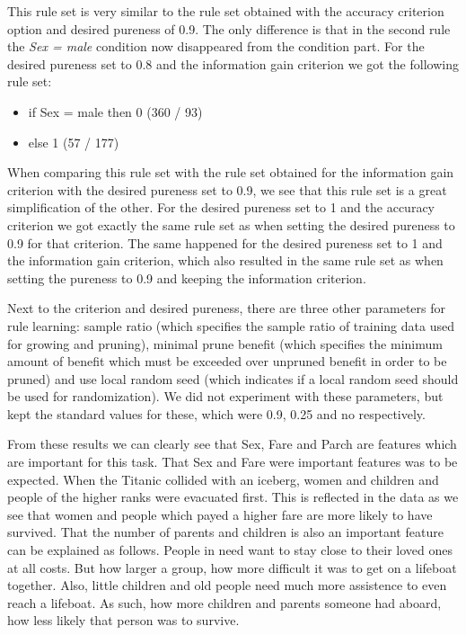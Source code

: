 \documentclass[12pt,a4paper]{article}
\begin{document}
\par This rule set is very similar to the rule set obtained with the accuracy criterion option and desired pureness of 0.9. The only difference is that in the second rule the \textit{Sex = male} condition now disappeared from the condition part. 
For the desired pureness set to 0.8 and the information gain criterion we got the following rule set:
\begin{itemize}

\item if Sex = male then 0  (360 / 93)
\item else 1  (57 / 177)

\end{itemize}
\par When comparing this rule set with the rule set obtained for the information gain criterion with the desired pureness set to 0.9, we see that this rule set is a great simplification of the other. For the desired pureness set to 1 and the accuracy criterion we got exactly the same rule set as when setting the desired pureness to 0.9 for that criterion. The same happened for the desired pureness set to 1 and the information gain criterion, which also resulted in the same rule set as when setting the pureness to 0.9 and keeping the information criterion.
\par Next to the criterion and desired pureness, there are three other parameters for rule learning: sample ratio (which specifies the sample ratio of training data used for growing and pruning), minimal prune benefit (which specifies the minimum amount of benefit which must be exceeded over unpruned benefit in order to be pruned) and use local random seed (which indicates if a local random seed should be used for randomization). We did not experiment with these parameters, but kept the standard values for these, which were 0.9, 0.25 and no respectively.
\par From these results we can clearly see that Sex, Fare and Parch are features which are important for this task. That Sex and Fare were important features was to be expected. When the Titanic collided with an iceberg, women and children and people of the higher ranks were evacuated first. This is reflected in the data as we see that women and people which payed a higher fare are more likely to have survived. That the number of parents and children is also an important feature can be explained as follows. People in need want to stay close to their loved ones at all costs. But how larger a group, how more difficult it was to get on a lifeboat together. Also, little children and old people need much more assistence to even reach a lifeboat. As such, how more children and parents someone had aboard, how less likely that person was to survive.
\end{document}
